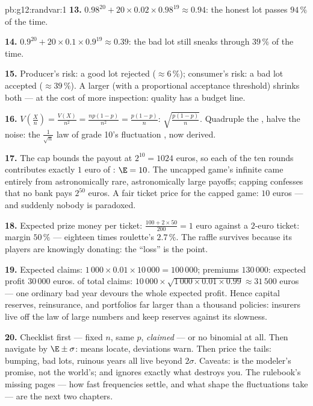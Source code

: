 \begin{solution}{pb:g12:randvar:1}
\textbf{13.} $0.98^{20} + 20 \times 0.02 \times 0.98^{19}
\approx 0.94$: the honest lot passes $94\,\%$ of the time.

\textbf{14.} $0.9^{20} + 20 \times 0.1 \times 0.9^{19}
\approx 0.39$: the bad lot still sneaks through $39\,\%$ of
the time.

\textbf{15.} Producer's risk: a good lot rejected
($\approx 6\,\%$); consumer's risk: a bad lot accepted
($\approx 39\,\%$). A larger  (with a proportional
acceptance threshold) shrinks both --- at the cost of more
inspection: quality has a budget line.

\textbf{16.} $V\!\left(\frac Xn\right) = \frac{V(X)}{n^2} =
\frac{np(1-p)}{n^2} = \frac{p(1-p)}{n}$: 
$\sqrt{\frac{p(1-p)}{n}}$. Quadruple the , halve the
noise: the $\frac{1}{\sqrt n}$ law of grade 10's fluctuation
, now derived.

\textbf{17.} The cap bounds the payout at $2^{10} = 1024$
euros, so each of the ten rounds contributes exactly $1$ euro
of : $\E = 10$. The uncapped game's infinite
 came entirely from astronomically rare,
astronomically large payoffs; capping confesses that no bank
pays $2^{50}$ euros. A fair ticket price for the capped game:
$10$ euros --- and suddenly nobody is paradoxed.

\textbf{18.} Expected prize money per ticket:
$\frac{100 + 2 \times 50}{200} = 1$ euro against a $2$-euro
ticket: margin $50\,\%$ --- eighteen times roulette's
$2.7\,\%$. The raffle survives because its players are
knowingly donating: the ``loss'' is the point.

\textbf{19.} Expected claims: $1\,000 \times 0.01 \times
10\,000 = 100\,000$; premiums $130\,000$: expected profit
$30\,000$ euros.  of total claims:
$10\,000 \times \sqrt{1\,000 \times 0.01 \times 0.99}
\approx 31\,500$ euros --- one ordinary bad year devours the
whole expected profit. Hence capital reserves, reinsurance,
and portfolios far larger than a thousand policies: insurers
live off the law of large numbers and keep reserves against
its slowness.

\textbf{20.} Checklist first --- fixed $n$, same $p$,
 \emph{claimed} --- or no binomial at all. Then
navigate by $\E \pm \sigma$: means locate, deviations warn.
Then price the tails: bumping, bad lots, ruinous years all
live beyond $2\sigma$. Caveats:  is the modeler's
promise, not the world's; and  ignores exactly
what destroys you. The rulebook's missing pages --- how fast
frequencies settle, and what shape the fluctuations take ---
are the next two chapters.
\end{solution}
